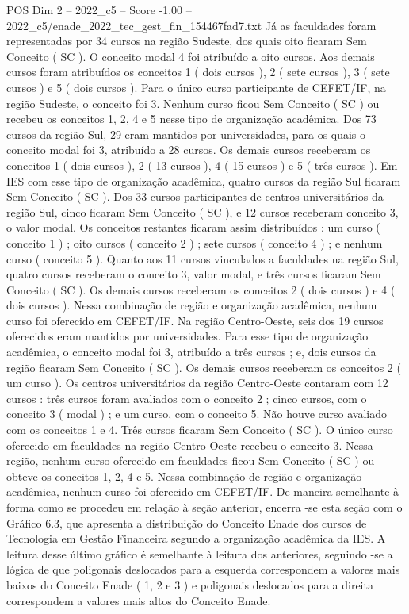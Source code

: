 \begin{textsample}{POS Dim 2 – 2022\_c5 – Score -1.00 – 2022\_c5/enade\_2022\_tec\_gest\_fin\_154467fad7.txt}
Já as faculdades foram representadas por 34 cursos na região Sudeste, dos quais oito ficaram Sem Conceito ( SC ).
O conceito modal 4 foi atribuído a oito cursos.
Aos demais cursos foram atribuídos os conceitos 1 ( dois cursos ), 2 ( sete cursos ), 3 ( sete cursos ) e 5 ( dois cursos ).
Para o único curso participante de CEFET/IF, na região Sudeste, o conceito foi 3.
Nenhum curso ficou Sem Conceito ( SC ) ou recebeu os conceitos 1, 2, 4 e 5 nesse tipo de organização acadêmica.
Dos 73 cursos da região Sul, 29 eram mantidos por universidades, para os quais o conceito modal foi 3, atribuído a 28 cursos.
Os demais cursos receberam os conceitos 1 ( dois cursos ), 2 ( 13 cursos ), 4 ( 15 cursos ) e 5 ( três cursos ).
Em IES com esse tipo de organização acadêmica, quatro cursos da região Sul ficaram Sem Conceito ( SC ).
Dos 33 cursos participantes de centros universitários da região Sul, cinco ficaram Sem Conceito ( SC ), e 12 cursos receberam conceito 3, o valor modal.
Os conceitos restantes ficaram assim distribuídos : um curso ( conceito 1 ) ; oito cursos ( conceito 2 ) ; sete cursos ( conceito 4 ) ; e nenhum curso ( conceito 5 ).
Quanto aos 11 cursos vinculados a faculdades na região Sul, quatro cursos receberam o conceito 3, valor modal, e três cursos ficaram Sem Conceito ( SC ).
Os demais cursos receberam os conceitos 2 ( dois cursos ) e 4 ( dois cursos ).
Nessa combinação de região e organização acadêmica, nenhum curso foi oferecido em CEFET/IF.
Na região Centro-Oeste, seis dos 19 cursos oferecidos eram mantidos por universidades.
Para esse tipo de organização acadêmica, o conceito modal foi 3, atribuído a três cursos ; e, dois cursos da região ficaram Sem Conceito ( SC ).
Os demais cursos receberam os conceitos 2 ( um curso ).
Os centros universitários da região Centro-Oeste contaram com 12 cursos : três cursos foram avaliados com o conceito 2 ; cinco cursos, com o conceito 3 ( modal ) ; e um curso, com o conceito 5.
Não houve curso avaliado com os conceitos 1 e 4.
Três cursos ficaram Sem Conceito ( SC ).
O único curso oferecido em faculdades na região Centro-Oeste recebeu o conceito 3.
Nessa região, nenhum curso oferecido em faculdades ficou Sem Conceito ( SC ) ou obteve os conceitos 1, 2, 4 e 5.
Nessa combinação de região e organização acadêmica, nenhum curso foi oferecido em CEFET/IF.
De maneira semelhante à forma como se procedeu em relação à seção anterior, encerra -se esta seção com o Gráfico 6.3, que apresenta a distribuição do Conceito Enade dos cursos de Tecnologia em Gestão Financeira segundo a organização acadêmica da IES.
A leitura desse último gráfico é semelhante à leitura dos anteriores, seguindo -se a lógica de que poligonais deslocados para a esquerda correspondem a valores mais baixos do Conceito Enade ( 1, 2 e 3 ) e poligonais deslocados para a direita correspondem a valores mais altos do Conceito Enade.

\end{textsample}
